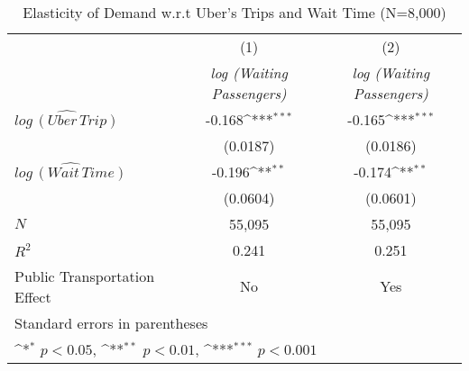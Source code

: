 \begin{table}[h]
\caption{Elasticity of Demand w.r.t Uber's Trips and Wait Time (N=8,000)}\label{tab:robust_uber_8000}\\

{
\def\sym#1{\ifmmode^{#1}\else\(^{#1}\)\fi}
\begin{center}
\begin{tabular}{l*{2}{c}}
\hline\hline
            &\multicolumn{1}{c}{(1)}&\multicolumn{1}{c}{(2)}\\
             &\multicolumn{1}{c}{\textit{log (Waiting Passengers)}}&\multicolumn{1}{c}{\textit{log (Waiting Passengers)}}\\
\hline
${\widehat{log\, (Uber\,Trip)}}$  &      -0.168\sym{***}&      -0.165\sym{***}\\
            &    (0.0187)         &    (0.0186)         \\
[1em]
${\widehat{log\, (Wait\, Time)}}$&      -0.196\sym{**}&      -0.174\sym{**} \\
            &    (0.0604)         &    (0.0601)         \\
\hline
\(N\)       &       55,095         &       55,095         \\
\(R^{2}\)   &       0.241         &       0.251         \\
Public Transportation Effect &         No            &             Yes        \\
\hline\hline
\multicolumn{3}{l}{\footnotesize Standard errors in parentheses}\\
\multicolumn{3}{l}{\footnotesize \sym{*} \(p<0.05\), \sym{**} \(p<0.01\), \sym{***} \(p<0.001\)}\\
\end{tabular}
\end{center}
}


\end{table}
